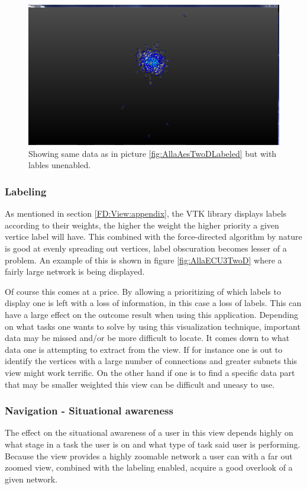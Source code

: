 \documentclass[a4paper,11pt]{kth-mag}
\begin{document}
\begin{figure}[!htbp]
	\centering
	\includegraphics[scale=0.3]{SesammVisualAppPics/2D-View/Unlabled/AE/AllaAE1}
	\caption{Showing same data as in picture \ref{fig:AllaAesTwoDLabeled} but with lables unenabled.}
	\label{fig:AllaAesTwoDUnLabeled}
\end{figure}

\subsubsection{Labeling}
As mentioned in section \ref{FD:View:appendix}, the VTK library displays labels according to their weights, the higher the weight the higher priority a given vertice label will have. This combined with the force-directed algorithm by nature is good at evenly spreading out vertices, label 
obscuration becomes lesser of a problem. An example of this is shown in figure \ref{fig:AllaECU3TwoD} where a fairly large network is being displayed. 

Of course this comes at a price. By allowing a prioritizing of which labels to display one is left with a
loss of information, in this case a loss of labels. This can have a large effect on the outcome result when using
this application. Depending on what tasks one wants to solve by using this visualization technique, important
data may be missed and/or be more difficult to locate. It comes down to what data one is attempting to extract
from the view. If for instance one is out to identify the vertices with a large number of connections and greater subnets
this view might work terrific. On the other hand if one is to find a specific data part that may be smaller weighted this view can be difficult and uneasy to use.
\subsubsection{Navigation - Situational awareness}
The effect on the situational awareness of a user in this view depends highly on what stage in a task the user is on and what type of task said user is performing. Because the view
provides a highly zoomable network a user can with a far out zoomed view, combined with the labeling enabled, acquire a good overlook of a given network.
\end{document}
